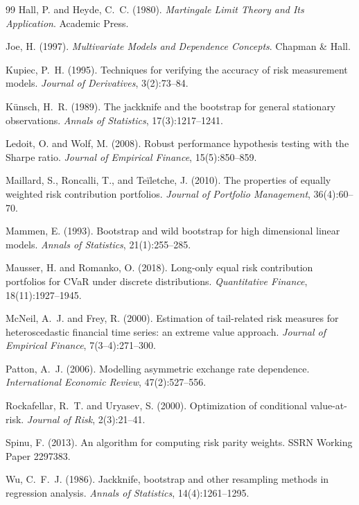 \documentclass[11pt,UTF8]{ctexart}
\newcommand{\1}{\mathbf{1}}
\begin{document}
\begin{thebibliography}{99}
Hall, P. and Heyde, C.~C. (1980). \emph{Martingale Limit Theory and Its Application}. Academic Press.

Joe, H. (1997). \emph{Multivariate Models and Dependence Concepts}. Chapman \& Hall.

Kupiec, P.~H. (1995). Techniques for verifying the accuracy of risk measurement models. \emph{Journal of
Derivatives}, 3(2):73--84.

K{\"u}nsch, H.~R. (1989). The jackknife and the bootstrap for general stationary observations.
\emph{Annals of Statistics}, 17(3):1217--1241.

Ledoit, O. and Wolf, M. (2008). Robust performance hypothesis testing with the Sharpe ratio.
\emph{Journal of Empirical Finance}, 15(5):850--859.

Maillard, S., Roncalli, T., and Te{\"i}letche, J. (2010). The properties of equally weighted risk
contribution portfolios. \emph{Journal of Portfolio Management}, 36(4):60--70.

Mammen, E. (1993). Bootstrap and wild bootstrap for high dimensional linear models. \emph{Annals of
Statistics}, 21(1):255--285.

Mausser, H. and Romanko, O. (2018). Long-only equal risk contribution portfolios for CVaR under discrete
distributions. \emph{Quantitative Finance}, 18(11):1927--1945.

McNeil, A.~J. and Frey, R. (2000). Estimation of tail-related risk measures for heteroscedastic financial
time series: an extreme value approach. \emph{Journal of Empirical Finance}, 7(3--4):271--300.

Patton, A.~J. (2006). Modelling asymmetric exchange rate dependence. \emph{International Economic Review},
47(2):527--556.

Rockafellar, R.~T. and Uryasev, S. (2000). Optimization of conditional value-at-risk. \emph{Journal of
Risk}, 2(3):21--41.

Spinu, F. (2013). An algorithm for computing risk parity weights. SSRN Working Paper 2297383.

Wu, C.~F.~J. (1986). Jackknife, bootstrap and other resampling methods in regression analysis.
\emph{Annals of Statistics}, 14(4):1261--1295.

\end{thebibliography}
\end{document}
